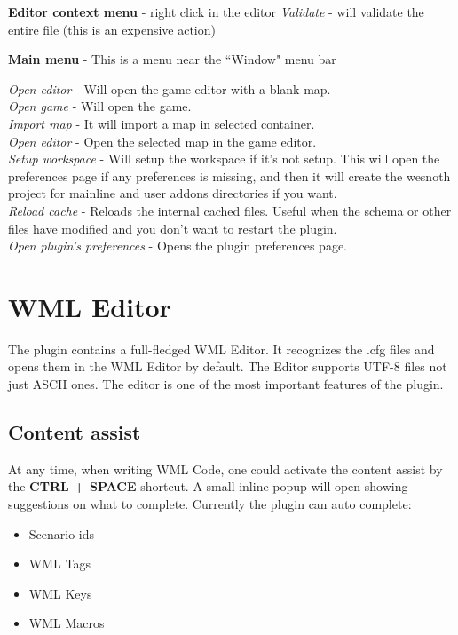 \documentclass[10pt]{article}
\begin{document}
\begin{description}
\item{\textbf{Editor context menu}} - right click in the editor
   \textit{Validate} - will validate the entire file (this is an expensive action)

\item{\textbf{Main menu}} - This is a menu near the ``Window" menu bar

   \textit{Open editor} - Will open the game editor with a blank map.\\
   \textit{Open game} - Will open the game.\\
   \textit{Import map} - It will import a map in selected container.\\
   \textit{Open editor} - Open the selected map in the game editor.\\
   \textit{Setup workspace} - Will setup the workspace if it's not setup. This will open the preferences page if any preferences is missing, and then it will create the wesnoth project for mainline and user addons directories if you want.\\
   \textit{Reload cache} - Reloads the internal cached files. Useful when the schema or other files have modified and you don't want to restart the plugin.\\
   \textit{Open plugin's preferences} - Opens the plugin preferences page.\\
\end{description}

\section{WML Editor}
The plugin contains a full-fledged WML Editor. It recognizes the .cfg files and opens them in the WML Editor by default. The Editor supports UTF-8 files not just ASCII ones. The editor is one of the most important features of the plugin.

\subsection{Content assist}
At any time, when writing WML Code, one could activate the content assist by the \textbf{CTRL + SPACE} shortcut. A small inline popup will open showing suggestions on what to complete. Currently the plugin can auto complete:
\begin{itemize}
  \item Scenario ids
  \item WML Tags
  \item WML Keys
  \item WML Macros
\end{itemize}
\end{document}
